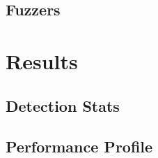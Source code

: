 \chapter{Fuzzers} \label{ch:fuzzers}



\part{Results}
\chapter{Detection Stats} \label{ch:stats}

\chapter{Performance Profile} \label{ch:profiling}


% 


